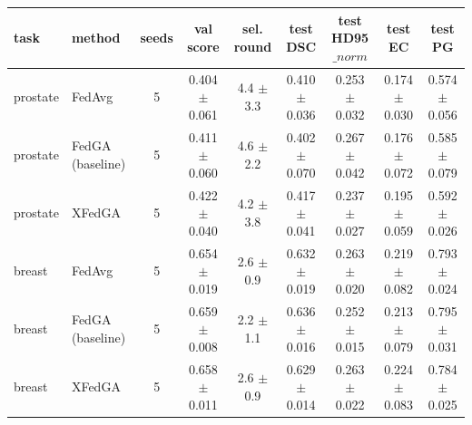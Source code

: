 \begin{tabular}{llccccccc}
\hline
task & method & seeds & val score & sel. round & test DSC & test HD95$\_{norm}$ & test EC & test PG \\
\hline
prostate & FedAvg & 5 & 0.404 $\pm$ 0.061 & 4.4 $\pm$ 3.3 & 0.410 $\pm$ 0.036 & 0.253 $\pm$ 0.032 & 0.174 $\pm$ 0.030 & 0.574 $\pm$ 0.056 \\
prostate & FedGA (baseline) & 5 & 0.411 $\pm$ 0.060 & 4.6 $\pm$ 2.2 & 0.402 $\pm$ 0.070 & 0.267 $\pm$ 0.042 & 0.176 $\pm$ 0.072 & 0.585 $\pm$ 0.079 \\
prostate & XFedGA & 5 & 0.422 $\pm$ 0.040 & 4.2 $\pm$ 3.8 & 0.417 $\pm$ 0.041 & 0.237 $\pm$ 0.027 & 0.195 $\pm$ 0.059 & 0.592 $\pm$ 0.026 \\
breast & FedAvg & 5 & 0.654 $\pm$ 0.019 & 2.6 $\pm$ 0.9 & 0.632 $\pm$ 0.019 & 0.263 $\pm$ 0.020 & 0.219 $\pm$ 0.082 & 0.793 $\pm$ 0.024 \\
breast & FedGA (baseline) & 5 & 0.659 $\pm$ 0.008 & 2.2 $\pm$ 1.1 & 0.636 $\pm$ 0.016 & 0.252 $\pm$ 0.015 & 0.213 $\pm$ 0.079 & 0.795 $\pm$ 0.031 \\
breast & XFedGA & 5 & 0.658 $\pm$ 0.011 & 2.6 $\pm$ 0.9 & 0.629 $\pm$ 0.014 & 0.263 $\pm$ 0.022 & 0.224 $\pm$ 0.083 & 0.784 $\pm$ 0.025 \\
\hline
\end{tabular}
